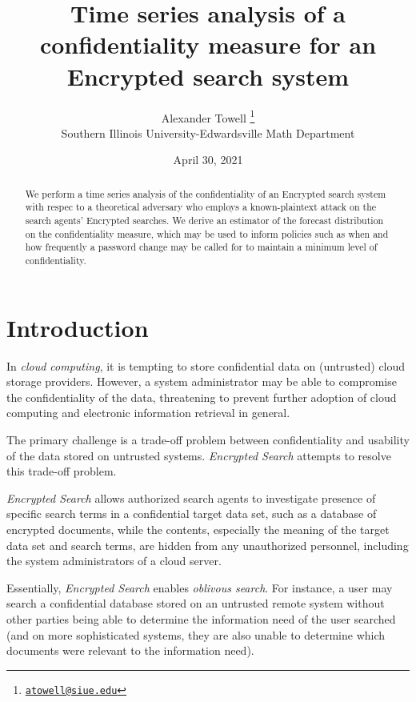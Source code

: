 \documentclass[final,
  11pt,
]{article}
\title{Time series analysis of a confidentiality measure for an Encrypted search system}
\author{Alexander Towell \thanks{\href{mailto:atowell@siue.edu}{\nolinkurl{atowell@siue.edu}}} \\ Southern Illinois University-Edwardsville Math Department}
\date{April 30, 2021}
\begin{document}
\maketitle
\begin{abstract}
We perform a time series analysis of the confidentiality of
an Encrypted search system with respec to a theoretical adversary
who employs a known-plaintext attack on the search agents' Encrypted searches. 
We derive an estimator of the forecast distribution on the confidentiality
measure, which may be used to inform policies such as when and how
frequently a password change may be called for to maintain a minimum
level of confidentiality.
\end{abstract}

{
\setcounter{tocdepth}{3}
\tableofcontents
}
\hypertarget{introduction}{%
\section{Introduction}\label{introduction}}

In \emph{cloud computing}, it is tempting to store confidential data on
(untrusted) cloud storage providers. However, a system administrator may
be able to compromise the confidentiality of the data, threatening to
prevent further adoption of cloud computing and electronic information
retrieval in general.

The primary challenge is a trade-off problem between confidentiality and
usability of the data stored on untrusted systems.
\emph{Encrypted Search} attempts to resolve this trade-off problem.

\begin{definition}
\emph{Encrypted Search} allows authorized search agents to investigate presence
of specific search terms in a confidential target data set, such as a database
of encrypted documents, while the contents, especially the meaning of the target
data set and search terms, are hidden from any unauthorized personnel, including
the system administrators of a cloud server.
\end{definition}

Essentially, \emph{Encrypted Search} enables \emph{oblivous search}. For
instance, a user may search a confidential database stored on an
untrusted remote system without other parties being able to determine
the information need of the user searched (and on more sophisticated
systems, they are also unable to determine which documents were relevant
to the information need).
\end{document}
